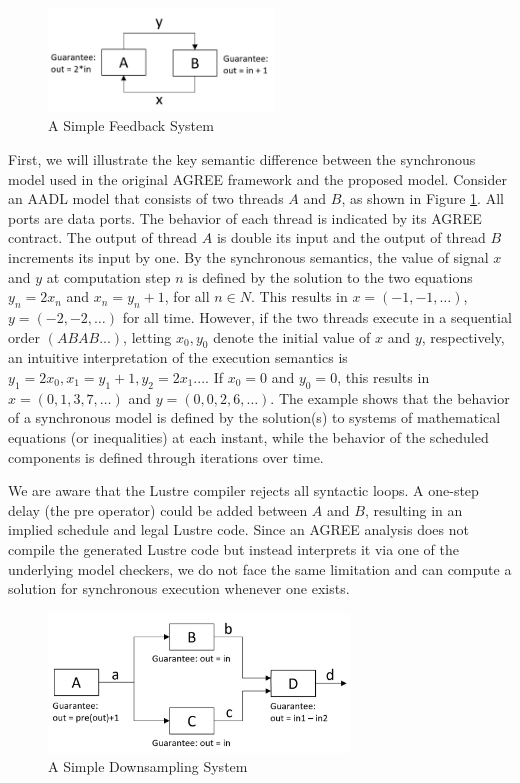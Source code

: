 \begin{figure}[ht!]
\centering
\includegraphics[width=60mm]{simpleFeedback.jpg}
\caption{A Simple Feedback System\label{motivationFig1}}
\end{figure}

First, we will illustrate the key semantic difference between the synchronous model used in the original AGREE framework and the proposed model.
Consider an AADL model that consists of two threads $A$ and $B$, as shown in Figure \ref{motivationFig1}. All ports are data ports. The behavior of each thread is indicated by its AGREE contract. The output of thread $A$ is double its input and the output of thread $B$ increments its input by one. By the synchronous semantics, the value of signal $x$ and $y$ at computation step $n$ is defined by the solution to the two equations $y_n = 2x_n$ and $x_n = y_n+1$, for all $n \in N$. This results in $x = (-1, -1, …)$, $y = (-2, -2, …)$ for all time. However, if the two threads execute in a sequential order $(ABAB...)$, letting $x_0, y_0$ denote the initial value of $x$ and $y$, respectively, an intuitive interpretation of the execution semantics is $y_1 = 2x_0, x_1 = y_1+1, y_2 = 2x_1...$. If $x_0 = 0$ and  $y_0 = 0$, this results in $x = (0, 1, 3, 7,…)$ and $y = (0, 0, 2, 6, …)$. The example shows that the behavior of a synchronous model is defined by the solution(s) to systems of mathematical equations (or inequalities) at each instant, while the behavior of the scheduled components is defined through iterations over time.  

We are aware that the Lustre compiler rejects all syntactic loops.  A one-step delay (the \textsf{pre} operator) could be added between $A$ and $B$, resulting in an implied schedule and legal Lustre code. Since an AGREE analysis does not compile the generated Lustre code but instead interprets it via one of the underlying model checkers, we do not face the same limitation and can compute a solution for synchronous execution whenever one exists.  

\begin{figure}[ht!]
\centering
\includegraphics[width=80mm]{downsample.jpg}
\caption{A Simple Downsampling System\label{motivationFig2}}
\end{figure}

